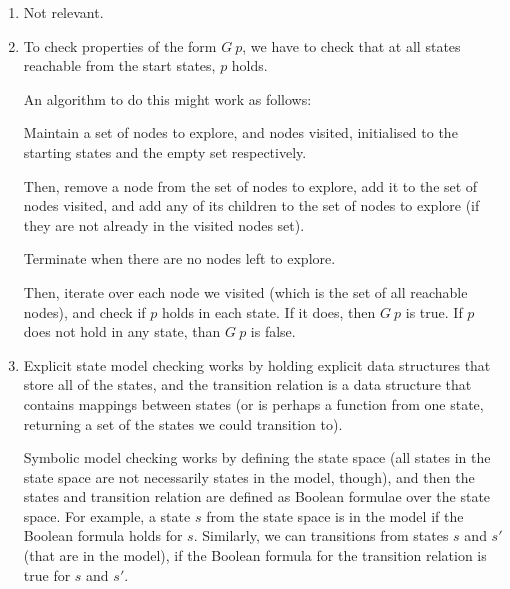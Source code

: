 


\begin{enumerate}[label=(\alph*)]

  \item
    Not relevant.

    \item
      To check properties of the form $G\ p$, we have to check that at all states reachable from the start states, $p$ holds.

      An algorithm to do this might work as follows:

      Maintain a set of nodes to explore, and nodes visited, initialised to the starting states and the empty set respectively.

      Then, remove a node from the set of nodes to explore, add it to the set of nodes visited, and add any of its children to the set of nodes to explore (if they are not already in the visited nodes set).

      Terminate when there are no nodes left to explore.

      Then, iterate over each node we visited (which is the set of all reachable nodes), and check if $p$ holds in each state. If it does, then $G\ p$ is true. If $p$ does not hold in any state, than $G\ p$ is false.

      \item

        Explicit state model checking works by holding explicit data structures that store all of the states, and the transition relation is a data structure that contains mappings between states (or is perhaps a function from one state, returning a set of the states we could transition to).

        Symbolic model checking works by defining the state space (all states in the state space are not necessarily states in the model, though), and then the states and transition relation are defined as Boolean formulae over the state space. For example, a state $s$ from the state space is in the model if the Boolean formula holds for $s$. Similarly, we can transitions from states $s$ and $s'$ (that are in the model), if the Boolean formula for the transition relation is true for $s$ and $s'$.
        
    \end{enumerate}

